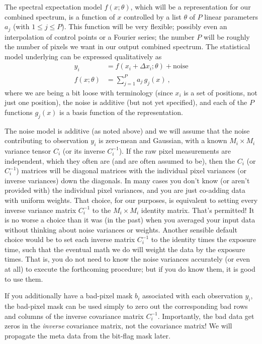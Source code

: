 \documentclass[modern]{aastex631}
\begin{document}
The spectral expectation model $f(x;\theta)$, which will be a representation for our combined spectrum, is a function of $x$ controlled by a list $\theta$ of $P$ linear parameters $a_j$ (with $1\leq j\leq P$).
This function will be very flexible; possibly even an interpolation of control points or a Fourier series; the number $P$ will be roughly the number of pixels we want in our output combined spectrum.
The statistical model underlying can be expressed qualitatively as
\begin{align}
    y_i &= f(x_i + \Delta x_i;\theta) + \mbox{noise} \\
    f(x;\theta) &= \sum_{j=1}^P a_j\,g_j(x) ~,
\end{align}
where we are being a bit loose with terminology (since $x_i$ is a set of positions, not just one position), the noise is additive (but not yet specified), and each of the $P$ functions $g_j(x)$ is a basis function of the representation.

The noise model is additive (as noted above) and we will assume that the noise contributing to observation $y_i$ is zero-mean and Gaussian, with a known $M_i\times M_i$ variance tensor $C_i$ (or its inverse $C_i^{-1}$).
If the raw pixel measurements are independent, which they often are (and are often assumed to be), then the $C_i$ (or $C_i^{-1}$) matrices will be diagonal matrices with the individual pixel variances (or inverse variances) down the diagonals.
In many cases you don't know (or aren't provided with) the individual pixel variances, and you are just co-adding data with uniform weights.
That choice, for our purposes, is equivalent to setting every inverse variance matrix $C_i^{-1}$ to the $M_i\times M_i$ identity matrix.
That's permitted!
It is no worse a choice than it was (in the past) when you averaged your input data without thinking about noise variances or weights.
Another sensible default choice would be to set each inverse matrix $C_i^{-1}$ to the identity times the exposure time, such that the eventual math we do will weight the data by the exposure times.
That is, you do not need to know the noise variances accurately (or even at all) to execute the forthcoming procedure; but if you do know them, it is good to use them.

If you additionally have a bad-pixel mask $b_i$ associated with each observation $y_i$, the bad-pixel mask can be used simply to zero out the corresponding bad rows and columns of the inverse covariance matrix $C_i^{-1}$.
Importantly, the bad data get zeros in the \emph{inverse} covariance matrix, not the covariance matrix!
We will propagate the meta data from the bit-flag mask later.
\end{document}
